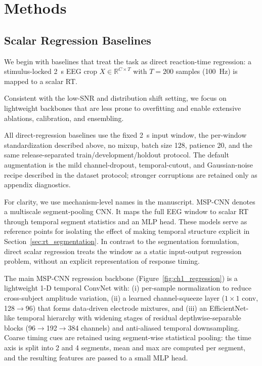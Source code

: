 \documentclass[12pt]{article}
\begin{document}
\section{Methods}

\subsection{Scalar Regression Baselines}

\label{sec:baseline_regression}

We begin with baselines that treat the task as direct reaction-time regression: a stimulus-locked 2~s EEG crop $X \in \mathbb{R}^{C \times T}$ with $T=200$ samples (100~Hz) is mapped to a scalar RT.

Consistent with the low-SNR and distribution shift setting, we focus on lightweight backbones that are less prone to overfitting and enable extensive ablations, calibration, and ensembling.

All direct-regression baselines use the fixed 2~s input window, the per-window standardization described above, no mixup, batch size 128, patience 20, and the same release-separated train/development/holdout protocol. The default augmentation is the mild channel-dropout, temporal-cutout, and Gaussian-noise recipe described in the dataset protocol; stronger corruptions are retained only as appendix diagnostics.

For clarity, we use mechanism-level names in the manuscript. MSP-CNN denotes a multiscale segment-pooling CNN. It maps the full EEG window to scalar RT through temporal segment statistics and an MLP head. These models serve as reference points for isolating the effect of making temporal structure explicit in Section~\ref{sec:rt_segmentation}. In contrast to the segmentation formulation, direct scalar regression treats the window as a static input-output regression problem, without an explicit representation of response timing.

The main MSP-CNN regression backbone (Figure~\ref{fig:ch1_regression}) is a lightweight 1-D temporal ConvNet with:
(i) per-sample normalization to reduce cross-subject amplitude variation,
(ii) a learned channel-squeeze layer ($1\times1$ conv, 128$\rightarrow$96) that forms data-driven electrode mixtures,
and (iii) an EfficientNet-like temporal hierarchy with widening stages of residual depthwise-separable blocks
(96$\rightarrow$192$\rightarrow$384 channels) and anti-aliased temporal downsampling.
Coarse timing cues are retained using segment-wise statistical pooling: the time axis is split into 2 and 4 segments,
mean and max are computed per segment, and the resulting features are passed to a small MLP head.
\end{document}
